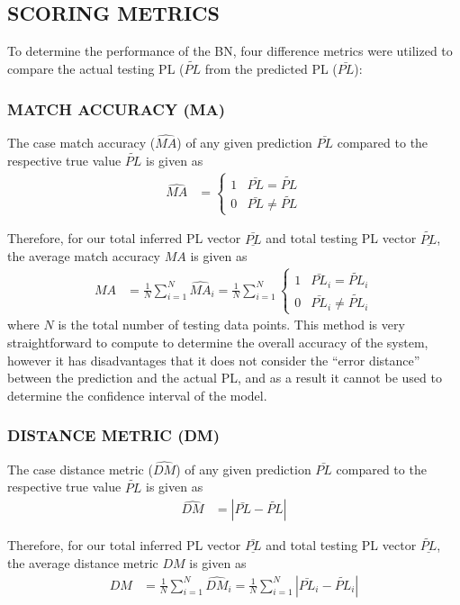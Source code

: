\documentclass[12pt]{article}
\begin{document}
\subsection{SCORING METRICS}
To determine the performance of the BN, four difference metrics were utilized to compare the actual testing PL ($\tilde{PL}$ from the predicted PL ($\bar{PL}$):

\subsubsection{MATCH ACCURACY (MA)}
The case match accuracy ($\hat{MA}$) of any given prediction $\bar{PL}$ compared to the respective true value $\tilde{PL}$ is given as
\begin{align}
    \hat{MA}&=\begin{cases}
        1 & \bar{PL}=\tilde{PL}\\0 & \bar{PL}\neq\tilde{PL}
    \end{cases}
\end{align}

Therefore, for our total inferred PL vector $\underline{\bar{PL}}$ and total testing PL vector $\underline{\tilde{PL}}$, the average match accuracy $MA$ is given as
\begin{align}\label{eqn:MA}
    MA&=\frac1N\sum_{i=1}^N\hat{MA}_i=\frac1N\sum_{i=1}^N\begin{cases}
        1 & \bar{PL}_i=\tilde{PL}_i\\0 & \bar{PL}_i\neq\tilde{PL}_i
    \end{cases}
\end{align}
where $N$ is the total number of testing data points. This method is very straightforward to compute to determine the overall accuracy of the system, however it has disadvantages that it does not consider the ``error distance'' between the prediction and the actual PL, and as a result it cannot be used to determine the confidence interval of the model.

\subsubsection{DISTANCE METRIC (DM)}
The case distance metric ($\hat{DM}$) of any given prediction $\bar{PL}$ compared to the respective true value $\tilde{PL}$ is given as
\begin{align}
    \hat{DM}&=|\bar{PL}-\tilde{PL}|
\end{align}

Therefore, for our total inferred PL vector $\underline{\bar{PL}}$ and total testing PL vector $\underline{\tilde{PL}}$, the average distance metric $DM$ is given as
\begin{align}\label{eqn:DM}
    DM&=\frac1N\sum_{i=1}^N\hat{DM}_i=\frac1N\sum_{i=1}^N|\bar{PL}_i-\tilde{PL}_i|
\end{align}
\end{document}
